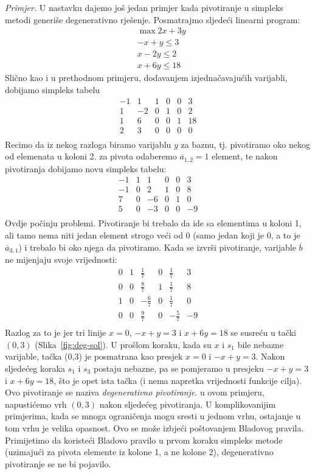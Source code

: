 \documentclass[a4paper, utf8, 11pt, colorlinks]{article}
\begin{document}
\emph{Primjer.} U nastavku dajemo još jedan primjer kada pivotiranje u simpleks metodi generiše degenerativno rješenje. 
Posmatrajmo sljedeći linearni program:
\begin{align*}
    &\max 2x + 3y \\
	& -x + y \leq 3 \\
	& x - 2y \leq 2 \\
	& x + 6y \leq 18
\end{align*}
Slično kao i u prethodnom primjeru, dodavanjem izjednačavajućih varijabli, dobijamo simpleks 
tabelu 
$$\begin{array}{ccccc|c}
     -1 & 1 & 1 & 0 & 0 & 3 \\
      1 &-2 & 0 & 1 & 0 & 2 \\
      1 & 6 & 0 & 0 & 1 & 18 \\ \hline
      2 & 3 & 0 & 0 & 0 & 0 \\
\end{array}$$
Recimo da iz nekog razloga biramo varijablu $y$ za baznu, tj. pivotiramo oko nekog od elemenata u koloni 2. za pivota odaberemo $\overline{a}_{1,2}=1$ element, te nakon pivotiranja dobijamo novu simpleks tabelu:
$$\begin{array}{ccccc|c}
	-1 & 1 & 1 & 0 & 0 & 3 \\
    -1 & 0 & 2 & 1 & 0 & 8 \\
    7 & 0 & -6 & 0 & 1 & 0 \\ \hline
    5 & 0 & -3 & 0 & 0 & -9 \\
\end{array}$$
Ovdje počinju problemi. Pivotiranje bi trebalo da ide sa elementima u koloni 1, ali tamo nema niti jedan element strogo veći od 0 (samo jedan koji je 0, a to je $\overline{a}_{3,1}$) i trebalo bi oko njega da pivotiramo. Kada se izvrši pivotiranje, varijable $\overline{b}$ ne mijenjaju svoje vrijednosti:
$$\begin{array}{ccccc|c}
     0 & 1 & \frac{1}{7}  & 0 & \frac{1}{7} & 3 \\
     0 & 0 & \frac{8}{7}  & 1 & \frac{1}{7} & 8 \\
     1 & 0 & -\frac{6}{7} & 0 & \frac{1}{7} & 0 \\ \hline
     0 & 0 & \frac{9}{7}  & 0 & -\frac{5}{7} & -9 \\
\end{array}$$
Razlog za to je jer tri linije $x=0$, $-x+y=3$ i $x+6y=18$ se susreću u tački $(0,3)$ (Slika~\ref{fig:deg-sol}). U prošlom koraku, kada su $x$ i $s_1$ bile nebazne varijable, tačka (0,3) je posmatrana kao presjek $x=0$ i $-x +y =3$. Nakon sljedećeg koraka $s_1$ i $s_3$ postaju nebazne, pa se pomjeramo u presjeku 
$-x+y=3$ i $x+6y=18$, što je opet ista tačka (i nema napretka vrijednosti funkcije cilja). 
 Ovo pivotiranje se naziva \emph{degenerativno pivotiranje}. u ovom primjeru, napustićemo vrh $(0,3)$ nakon sljedećeg pivotiranja. U komplikovanijim primjerima, kada se mnoga ograničenja mogu sresti u jednom vrhu, ostajanje u tom vrhu je velika opasnost. Ovo se može izbjeći poštovanjem 
 Bladovog pravila. Primijetimo da koristeći Bladovo pravilo u prvom koraku simpleks metode (uzimajući za pivota elemente iz kolone 1, a ne kolone 2), degenerativno pivotiranje se ne bi pojavilo.  
\end{document}
